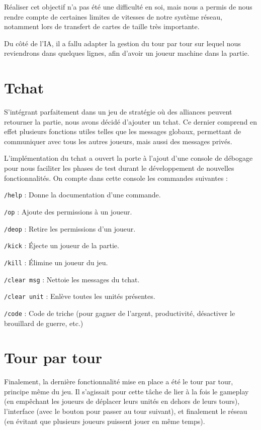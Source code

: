 \documentclass[12pt]{report}
\begin{document}
Réaliser cet objectif n’a pas été une difficulté en soi, mais nous a permis de
nous rendre compte de certaines limites de vitesses de notre système réseau,
notamment lors de transfert de cartes de taille très importante.

Du côté de l’IA, il a fallu adapter la gestion du tour par tour sur lequel nous
reviendrons dans quelques lignes, afin d’avoir un joueur machine dans la partie.

\section{Tchat}

S’intégrant parfaitement dans un jeu de stratégie où des alliances peuvent
retourner la partie, nous avons décidé d’ajouter un tchat. Ce dernier comprend
en effet plusieurs fonctions utiles telles que les messages globaux, permettant
de communiquer avec tous les autres joueurs, mais aussi des messages privés.

L’implémentation du tchat a ouvert la porte à l’ajout d’une console de débogage
pour nous faciliter les phases de test durant le développement de nouvelles
fonctionnalités. On compte dans cette console les commandes suivantes :

\verb|/help| : Donne la documentation d’une commande.

\verb|/op| : Ajoute des permissions à un joueur.

\verb|/deop| : Retire les permissions d’un joueur.

\verb|/kick| : Éjecte un joueur de la partie.

\verb|/kill| : Élimine un joueur du jeu.

\verb|/clear msg| : Nettoie les messages du tchat.

\verb|/clear unit| : Enlève toutes les unités présentes.

\verb|/code| : Code de triche (pour gagner de l’argent, productivité, désactiver le
brouillard de guerre, etc.)

\section{Tour par tour}

Finalement, la dernière fonctionnalité mise en place a été le tour par tour,
principe même du jeu. Il s’agissait pour cette tâche de lier à la fois le
gameplay (en empêchant les joueurs de déplacer leurs unités en dehors de leurs
tours), l’interface (avec le bouton pour passer au tour suivant), et finalement
le réseau (en évitant que plusieurs joueurs puissent jouer en même temps).
\end{document}
